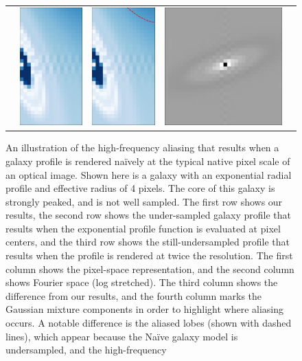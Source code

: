\documentclass[11pt,preprint]{aastex}
\begin{document}
\begin{figure}
\begin{center}
\begin{tabular}{@{}ccccc@{}}
      &
      \includegraphics[height=0.24\textwidth]{lopass-diff-dclipmine-fourier}
      &
      \includegraphics[height=0.24\textwidth]{lopass-diff-dclipmine-fourier-ann}
      &
      \includegraphics[height=0.24\textwidth]{lopass-diff-dclipmine-pix}
    \end{tabular}
    \caption{
      \label{fig:aliasing}
      An illustration of the high-frequency aliasing that results when
      a galaxy profile is rendered na\"ively at the typical native
      pixel scale of an optical image.  Shown here is a galaxy with an
      exponential radial profile and effective radius of 4 pixels.
      The core of this galaxy is strongly peaked, and is not well
      sampled.  The first row shows our results, the second row shows
      the under-sampled galaxy profile that results when the
      exponential profile function is evaluated at pixel centers, and
      the third row shows the still-undersampled profile that results
      when the profile is rendered at twice the resolution.
      The first column shows the pixel-space representation, and the
      second column shows Fourier space (log stretched).  The third
      column shows the difference from our results, and the fourth
      column marks the Gaussian mixture components in order to
      highlight where aliasing occurs.  A notable difference is the
      aliased lobes (shown with dashed lines), which appear because
      the Na\"ive galaxy model is undersampled, and the high-frequency
}
\end{center}
\end{figure}
\end{document}

